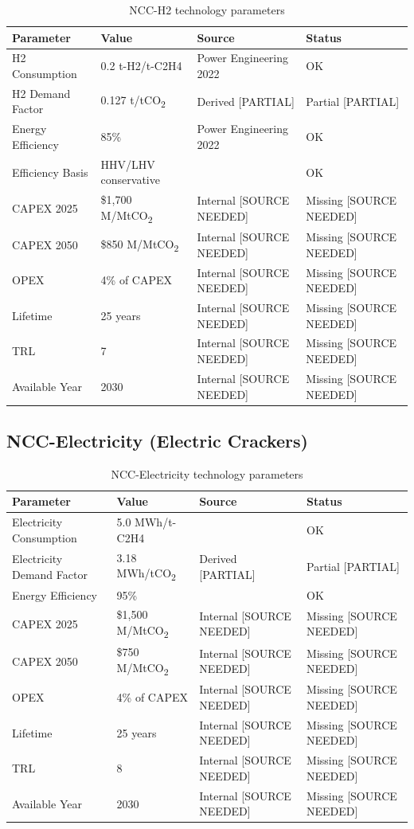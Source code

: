 \documentclass[12pt,a4paper]{article}
\newcommand{\sourceok}[1]{\textcolor{sourcegreen}{#1}}
\newcommand{\nosource}[1]{\textcolor{sourcered}{#1 [SOURCE NEEDED]}}
\newcommand{\partialsource}[1]{\textcolor{sourceyellow}{#1 [PARTIAL]}}
\newcommand{\COtwo}{CO\textsubscript{2}}
\begin{document}
\begin{table}[H]
\centering
\begin{tabular}{llll}
\toprule
\textbf{Parameter} & \textbf{Value} & \textbf{Source} & \textbf{Status} \\
\midrule
H2 Consumption & 0.2 t-H2/t-C2H4 & Power Engineering 2022 & \sourceok{OK} \\
H2 Demand Factor & 0.127 t/t\COtwo & \partialsource{Derived} & \partialsource{Partial} \\
Energy Efficiency & 85\% & Power Engineering 2022 & \sourceok{OK} \\
Efficiency Basis & HHV/LHV conservative & \citet{coolbrook2024} & \sourceok{OK} \\
CAPEX 2025 & \$1,700 M/Mt\COtwo & \nosource{Internal} & \nosource{Missing} \\
CAPEX 2050 & \$850 M/Mt\COtwo & \nosource{Internal} & \nosource{Missing} \\
OPEX & 4\% of CAPEX & \nosource{Internal} & \nosource{Missing} \\
Lifetime & 25 years & \nosource{Internal} & \nosource{Missing} \\
TRL & 7 & \nosource{Internal} & \nosource{Missing} \\
Available Year & 2030 & \nosource{Internal} & \nosource{Missing} \\
\bottomrule
\end{tabular}
\caption{NCC-H2 technology parameters}
\end{table}

\subsection{NCC-Electricity (Electric Crackers)}

\begin{table}[H]
\centering
\begin{tabular}{llll}
\toprule
\textbf{Parameter} & \textbf{Value} & \textbf{Source} & \textbf{Status} \\
\midrule
Electricity Consumption & 5.0 MWh/t-C2H4 & \citet{basf2024} & \sourceok{OK} \\
Electricity Demand Factor & 3.18 MWh/t\COtwo & \partialsource{Derived} & \partialsource{Partial} \\
Energy Efficiency & 95\% & \citet{basf2024} & \sourceok{OK} \\
CAPEX 2025 & \$1,500 M/Mt\COtwo & \nosource{Internal} & \nosource{Missing} \\
CAPEX 2050 & \$750 M/Mt\COtwo & \nosource{Internal} & \nosource{Missing} \\
OPEX & 4\% of CAPEX & \nosource{Internal} & \nosource{Missing} \\
Lifetime & 25 years & \nosource{Internal} & \nosource{Missing} \\
TRL & 8 & \nosource{Internal} & \nosource{Missing} \\
Available Year & 2030 & \nosource{Internal} & \nosource{Missing} \\
\bottomrule
\end{tabular}
\caption{NCC-Electricity technology parameters}
\end{table}
\end{document}
